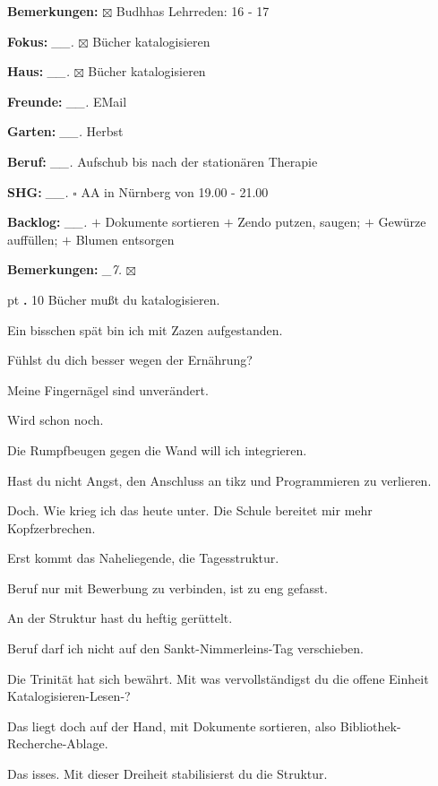 \documentclass[10pt,a4paper]{article}
\newcounter{notec}
\newcommand\notep[1]{%
  \stepcounter{notec}
  \vskip #1pt
  {\bf\arabic{notec}.}
}
\newcommand\mand[1] {{\color {burntorange} {\bf #1}}}     %
\newcommand\n[1] { {\sl #1.} \hskip 5pt }
\begin{document}
\begin{mdframed}[style=daystyle]
\begin{labeling}{{\mand {Bemerkungen:}}}
      $\boxtimes$ Budhhas Lehrreden: 16 - 17
  \item[{\mand {Fokus:}}]        \n{\_\_} $\boxtimes$ Bücher katalogisieren
  \item[{\mand {Haus:}}]         \n{\_\_} $\boxtimes$ Bücher katalogisieren
  \item[{\mand {Freunde:}}]      \n{\_\_} EMail
  \item[{\mand {Garten:}}]       \n{\_\_} Herbst
  \item[{\mand {Beruf:}}]        \n{\_\_} Aufschub bis nach der stationären Therapie
  \item[{\mand {SHG:}}]          \n{\_\_} $\square$ AA in Nürnberg von 19.00 - 21.00
  \item[{\mand {Backlog:}}]      \n{\_\_} 
    $+$ Dokumente sortieren
    $+$ Zendo putzen, saugen; $+$ Gewürze auffüllen; $+$ Blumen entsorgen
  \item[{\mand {Bemerkungen:}}]   \n{\_7} $\boxtimes$
  \end{labeling}
    
  \setcounter{notec}{0}
  
  \notep 0 10 Bücher mußt du katalogisieren.

  \vskip 2pt
  Ein bisschen spät bin ich mit Zazen aufgestanden.

  \vskip 2pt
  Fühlst du dich besser wegen der Ernährung?

  \vskip 2pt
  Meine Fingernägel sind unverändert.

  \vskip 2pt
  Wird schon noch.

  \vskip 2pt
  Die Rumpfbeugen gegen die Wand will ich integrieren.

  \vskip 2pt
  Hast du nicht Angst, den Anschluss an tikz und Programmieren zu verlieren.

  \vskip 2pt
  Doch. Wie krieg ich das heute unter. Die Schule bereitet mir mehr Kopfzerbrechen.

  \vskip 2pt
  Erst kommt das Naheliegende, die Tagesstruktur.

  \vskip 2pt
  Beruf nur mit Bewerbung zu verbinden, ist zu eng gefasst.

  \vskip 2pt
  An der Struktur hast du heftig gerüttelt.

  \vskip 2pt
  Beruf darf ich nicht auf den Sankt-Nimmerleins-Tag verschieben.

  \vskip 2pt
  Die Trinität hat sich bewährt. Mit was vervollständigst du die offene Einheit
  Katalogisieren-Lesen-?

  \vskip 2pt
  Das liegt doch auf der Hand, mit Dokumente sortieren, also Bibliothek-Recherche-Ablage.

  \vskip 2pt
  Das isses. Mit dieser Dreiheit stabilisierst du die Struktur.

\end{mdframed}
\end{document}
